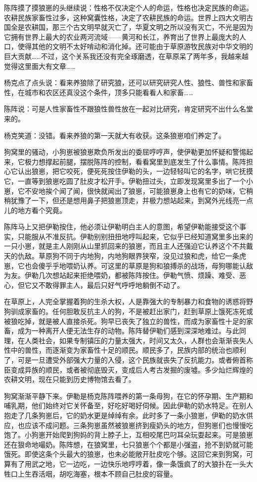 \par 陈阵摸了摸狼崽的头继续说：性格不仅决定个人的命运，性格也决定民族的命运。农耕民族家畜性过多，这种窝囊性格，决定了农耕民族的命运。世界上四大文明古国全是农耕国，那三个古文明早就灭亡了，华夏文明之所以没有灭亡，不光是因为它拥有世界上最大的农业两河流域——黄河和长江，养育出了世界上最庞大的人口，使得其他的文明不太好啃动和消化掉。还可能由于草原游牧民族对中华文明的巨大贡献……不过，这个关系我还没有完全琢磨透，在草原呆了两年多，我越来越觉得这里面大有文章……
\par 杨克点了点头说：看来养狼除了研究狼，还可以研究研究人性、狼性、兽性和家畜性，在城市和农区还真没这个条件，顶多只能看看人和家畜……
\par 陈阵说：可是人性家畜性不跟狼性兽性放在一起对比研究，肯定研究不出什么名堂来的。
\par 杨克笑道：没错。看来养狼的第一天就大有收获。这条狼崽咱们养定了。
\par 狗窝里的骚动，小狗崽被狼崽欺负所发出的委屈哼哼声，使伊勒更加怀疑和警惕起来，它极力想撑起前腿，摆脱陈阵的控制，看看窝里到底发生了什么事情。陈阵担心它认出狼崽，把它咬死，便死死按住伊勒的头，一边轻轻叫它的名字，哄它抚摸它，一直等到狼崽吃圆了肚皮才松开手。伊勒扭过头，立即发现窝里多出了一个小崽，它不安地挨个闻了闻，很快就闻出了狼崽，可能狼崽身上也有它的奶味，它稍稍犹豫了一下，但还是想用鼻子把狼崽顶走，并极力想站起来，到窝外光线亮一点儿的地方看个究竟。
\par 陈阵马上又把伊勒按住，他必须让伊勒明白主人的意图，希望伊勒能接受这个事实，只能服从不准反抗。伊勒别别扭扭地哼叫起来，它似乎已经知道窝里多出来的一只小崽，就是主人刚刚从山里抓回来的狼崽，而且主人还强迫它认养这个不共戴天的仇敌。草原狗不同于内地狗，内地狗眼界狭窄，没见过狼和虎，给它一条虎崽，它也会傻乎乎地喂奶认养。可这里的草原是狗和狼搏杀的战场，母狗哪能认敌为友。伊勒几次想站起来拒绝喂奶，都被陈阵按住。伊勒气愤、烦躁、难受、恶心，但它又不敢得罪主人，最后只好气呼呼地躺倒不动了。
\par 在草原上，人完全掌握着狗的生杀大权，人是靠强大的专制暴力和食物的诱惑将野狗驯成家畜的。任何胆敢反抗主人的狗，不是被赶出家门，赶到草原上饿死冻死或被狼吃掉，就是被人直接杀死。狗早已丧失了独立的兽性，而成为家畜性十足的家畜，成为一种离开人便无法生存的动物。陈阵替伊勒们感到深深地难过。与此同理，在人类社会，如果专制镇压的力量太强大，时间又太久，人群也会渐渐丧失人性中的兽性，而逐渐变为家畜性十足的顺民。顺民多了，民族内部的统治也顺利了，可是一旦遭受外部强大力量的入侵，这个民族就丧失了反抗能力。或者俯首称臣变成异族的顺民，或者被彻底毁灭，变成后人考古发掘的废墟。多少灿烂辉煌的农耕文明，现在只能到历史博物馆去看了。
\par 狗窝渐渐平静下来。伊勒是杨克陈阵喂养的第一条母狗，在它的怀孕期、生产期和哺乳期，他们始终对它关怀备至，好吃好喝好伺候。因此伊勒的奶水特足。在别人抱走了几条狗崽后，它的奶水更是绰绰有余。此时多了一条小狼崽，伊勒的奶水供应，也应该不成问题。三条狗崽虽然被狼崽挤到瘦奶头的地方，但狗崽们也慢慢吃饱了。小狗崽开始爬到狗妈的背上脖子上，互相咬尾巴叼耳朵玩耍起来。可是狼崽还在狠命地嘬奶。陈阵想，在狼窝里，七只狼崽个个都是小强盗，抢不到奶就可能饿死。即使这条个头最大的狼崽，也未必能敞开肚皮吃个够。这回它来到狗窝，可算有了用武之地，它一边吃，一边快乐地哼哼着，像一条饿疯了的大狼扑在一头大牲口上生吞活咽，胡吃海塞，根本不顾自己肚皮的容量。
